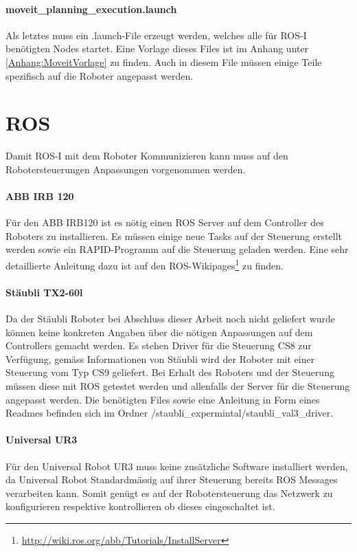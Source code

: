 \paragraph{moveit\_planning\_execution.launch}
Als letztes muss ein .launch-File erzeugt werden, welches alle für ROS-I benötigten Nodes startet. Eine Vorlage dieses Files ist im Anhang unter \ref{Anhang:MoveitVorlage} zu finden. Auch in diesem File müssen einige Teile spezifisch auf die Roboter angepasst werden. 
\section{ROS}
Damit ROS-I mit dem Roboter Kommunizieren kann muss auf den Robotersteuerungen Anpassungen vorgenommen werden.
\paragraph{ABB IRB 120}
Für den ABB IRB120 ist es nötig einen ROS Server auf dem Controller des Roboters zu installieren. Es müssen einige neue Tasks auf der Steuerung erstellt werden sowie ein RAPID-Programm auf die Steuerung geladen werden. Eine sehr detaillierte Anleitung dazu ist auf den ROS-Wikipages\footnote{\url{http://wiki.ros.org/abb/Tutorials/InstallServer}} zu finden.

\paragraph{Stäubli TX2-60l}
Da der Stäubli Roboter bei Abschluss dieser Arbeit noch nicht geliefert wurde können keine konkreten Angaben über die nötigen Anpassungen auf dem Controllers gemacht werden. Es stehen Driver für die Steuerung CS8 zur Verfügung, gemäss Informationen von Stäubli wird der Roboter mit einer Steuerung vom Typ CS9 geliefert. Bei Erhalt des Roboters und der Steuerung müssen diese mit ROS getestet werden und allenfalls der Server für die Steuerung angepasst werden. Die benötigten Files sowie eine Anleitung in Form eines Readmes befinden sich im Ordner /staubli\_expermintal/staubli\_val3\_driver.

\paragraph{Universal UR3}
Für den Universal Robot UR3 muss keine zusätzliche Software installiert werden, da Universal Robot Standardmässig auf ihrer Steuerung bereits ROS Messages verarbeiten kann. Somit genügt es auf der Robotersteuerung das Netzwerk zu konfigurieren respektive kontrollieren ob dieses eingeschaltet ist. 